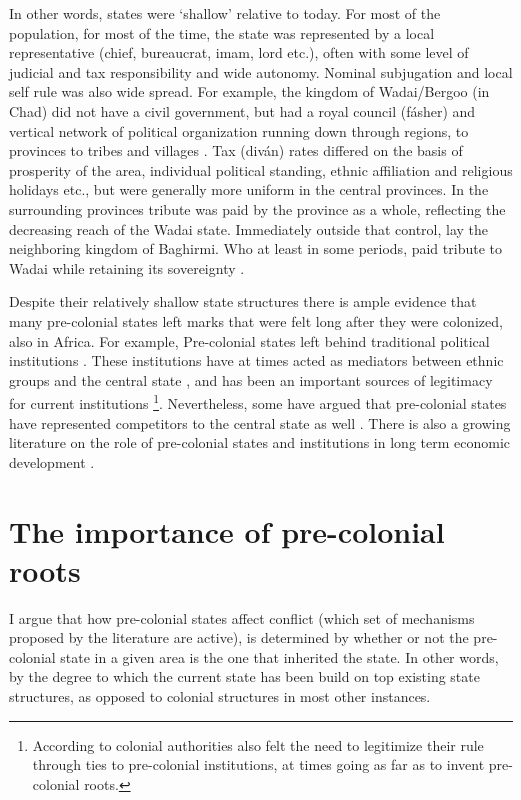 \documentclass[12pt]{article}
\begin{document}
In other words, states were `shallow' relative to today. For most of the
population, for most of the time, the state was represented by a local
representative (chief, bureaucrat, imam, lord etc.), often with some level of
judicial and tax responsibility and wide autonomy. Nominal subjugation
and local self rule was also wide spread. For example, the kingdom of
Wadai/Bergoo (in Chad) did not have a civil government, but had a royal council
(fásher) and vertical network of political organization running down through
regions, to provinces to tribes and villages \citep{barth1857travels}. Tax (diván)
rates differed on the basis of prosperity of the area, individual political
standing, ethnic affiliation and religious holidays etc., but were generally more
uniform in the central provinces. In the surrounding provinces tribute was paid
by the province as a whole, reflecting the decreasing reach of the Wadai
state. Immediately outside that control, lay the neighboring kingdom of
Baghirmi. Who at least in some periods, paid tribute to Wadai while retaining
its sovereignty \citep{barth1857travels}.

Despite their relatively shallow state structures there is ample evidence that
many pre-colonial states left marks that were felt long after they were
colonized, also in Africa. For example, Pre-colonial states left behind
traditional political institutions \citep{Beall_2005, Holzinger_2020,
Neupert_Wentz_2021, Ubink_2008}. These institutions have at times acted as
mediators between ethnic groups and the central state \citep{boone2014property,
Englebert2002}, and has been an important sources of legitimacy for current
institutions \citep{Wig2016}\footnote{According to \citet{mamdani2018citizen}
	colonial authorities also felt the need to legitimize their rule through
	ties to pre-colonial institutions, at times going as far as to invent
pre-colonial roots.}. Nevertheless, some have argued that pre-colonial states
have represented competitors to the central state as well \citep{Herbst2014}.
There is also a growing literature on the role of pre-colonial states and
institutions in long term economic development \citep{Michalopoulos2018,
Acemoglu2014, Gennaioli2007, Bockstette2002}.

\section{The importance of pre-colonial roots}

I argue that how pre-colonial states affect conflict (which set of mechanisms
proposed by the literature are active), is determined by whether or not the
pre-colonial state in a given area is the one that inherited the state.
In other words, by the degree to which the current state has been build on top
existing state structures, as opposed to colonial structures in most other
instances. 
\end{document}
